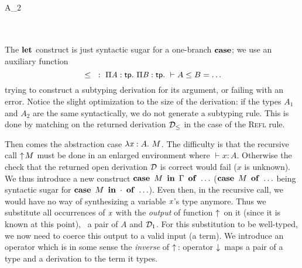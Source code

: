 \documentclass{llncs}
\begin{document}
\begin{mathleft}
  \quad{} \\
  \quad\quad{} {}
   {}
   { {A_2}} \\
  \quad\quad
  \match{\md_{\leq}} \\
  \quad\quad\quad{}
   {} \\
  \quad\quad\quad\caseb{\_}
   {}
\end{mathleft}

\noindent
The $\operatorname{\bf let}$ construct is just syntactic sugar for a one-branch
$\operatorname{\bf case}$; we use an auxiliary function $${}\leq{}\ :\ \Pi{\ensuremath{\text{\textit{A}}}}:{\text{\textsf{tp}}}.\  \Pi{\ensuremath{\text{\textit{B}}}}:{\text{\textsf{tp}}}.\  \vdash A\leq B = \ldots$$ trying to
construct a subtyping derivation for its argument, or failing with an
error. Notice the slight optimization to the size of the derivation:
if the types $A_1$ and $A_2$ are the same syntactically, we do not
generate a subtyping rule. This is done by matching on the returned
derivation $\mathcal D_\leq$ in the case of the \textsc{Refl} rule.

Then comes the abstraction case $\lambda{\ensuremath{\text{\textit{x}}}}:{A}.\  M$. The difficulty is that
the recursive call $\uparrow\!{M}$ must be done in an enlarged
environment where $\vdash x : A$. Otherwise the check that the
returned open derivation $\mathcal D$ is correct would fail ($x$ is
unknown). We thus introduce a new construct $\operatorname{\bf case}\ {{M}\ \operatorname{\bf in}\ {\Gamma}}\ \operatorname{\bf of}\  \ldots$
($\operatorname{\bf case}\ {M}\ \operatorname{\bf of}\  \ldots$ being syntactic sugar for $\operatorname{\bf case}\ {{M}\ \operatorname{\bf in}\ {\cdot}}\ \operatorname{\bf of}\ 
\ldots$). Even then, in the recursive call, we would have no way of
synthesizing a variable $\text{\textit{x}}$'s type anymore. Thus we substitute
all occurrences of $\text{\textit{x}}$ with the \emph{output} of function
$\uparrow\!{}$ on it (since it is known at this point), \ie\ a pair of
$A$ and $\mathcal D_1$. For this substitution to be well-typed, we now need
to coerce this output to a valid input (a term). We introduce an
operator which is in some sense the \emph{inverse} of $\uparrow\!{}$:
operator $\downarrow\!{}$ maps a pair of a type and a derivation to the term
it types.

\begin{mathleft}
  \quad{}
  {}
\end{mathleft}
\end{document}
